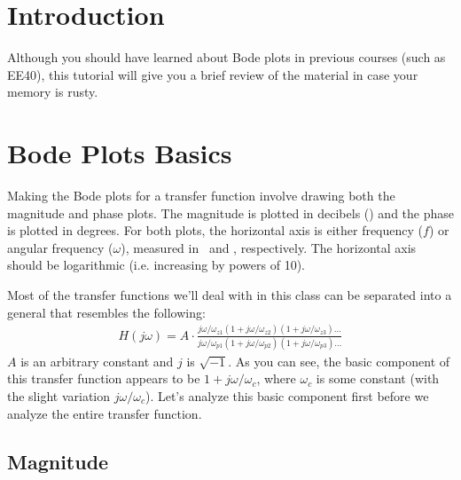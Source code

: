 \documentclass{article}
\begin{document}
\thispagestyle{plain}


\tableofcontents

\section{Introduction}

Although you should have learned about Bode plots in previous courses (such as EE40), this tutorial will give you a brief review of the material in case your memory is rusty.

\section{Bode Plots Basics}

Making the Bode plots for a transfer function involve drawing both the magnitude and phase plots. The magnitude is plotted in decibels (\deci\bel) and the phase is plotted in degrees. For both plots, the horizontal axis is either frequency ($f$) or angular frequency ($\omega$), measured in \hertz\ and \radian\per\second, respectively. The horizontal axis should be logarithmic (i.e. increasing by powers of 10).

Most of the transfer functions we'll deal with in this class can be separated into a general that resembles the following:
\begin{align}
  H(j\omega) = A \cdot \frac{j\omega/\omega_{z1}\left(1+j\omega/\omega_{z2}\right)\left(1+j\omega/\omega_{z3}\right)\ldots}{j\omega/\omega_{p1}\left(1+j\omega/\omega_{p2}\right)\left(1+j\omega/\omega_{p3}\right)\ldots}
\label{canonical}
\end{align}
$A$ is an arbitrary constant and $j$ is $\sqrt{-1}$. As you can see, the basic component of this transfer function appears to be $1 + j\omega/\omega_c$, where $\omega_c$ is some constant (with the slight variation $j\omega/\omega_c$). Let's analyze this basic component first before we analyze the entire transfer function.

\subsection{Magnitude}
\end{document}
